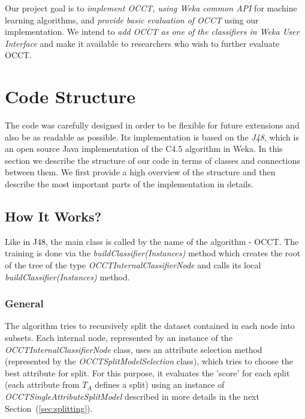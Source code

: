 \documentclass[a4paper,12pt]{article}
\begin{document}
\begin{spacing}{1.5}
Our project goal is to {\em implement OCCT, using Weka common API} for machine learning algorithms, and {\em provide basic evaluation of OCCT} using our implementation. We intend to {\em add OCCT as one of the classifiers in Weka User Interface} and make it available to researchers who wish to further
evaluate OCCT.

\section{Code Structure}
The code was carefully designed in order to be flexible for future extensions and also be as readable as possible. Its implementation is based on the {\em J48}, which is an open source Java implementation of the C4.5 algorithm in Weka. In this section we describe the structure of our code in terms of classes and connections between them. We first provide a high overview of the structure and then describe the most important parts of the implementation in details.

\subsection{How It Works?}
Like in J48, the main class is called by the name of the algorithm - OCCT. The training is done via the {\em buildClassifier(Instances)} method which creates the root of the tree of the type {\em OCCTInternalClassifierNode} and calls its local {\em buildClassifier(Instances)} method.

\subsubsection{General}
The algorithm tries to recursively split the dataset contained in each node into subsets. Each internal node, represented by an instance of the {\em OCCTInternalClassifierNode} class, uses an attribute selection method (represented by the {\em OCCTSplitModelSelection} class), which tries to choose the best attribute for split. For this purpose, it evaluates the 'score' for each split (each attribute from $T_{A}$ defines a split) using an instance of {\em OCCTSingleAttributeSplitModel} described in more details in the next Section~(\ref{sec:splitting}).



\end{spacing}
\end{document}
